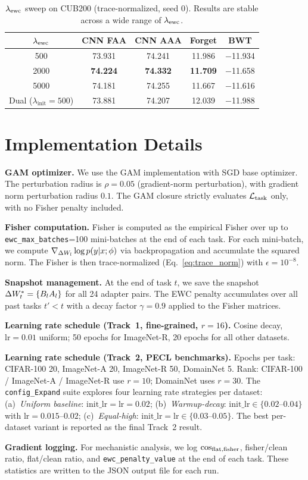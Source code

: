 \begin{table}[h]
\caption{$\lambda_{\mathrm{ewc}}$ sweep on CUB200 (trace-normalized, seed 0).
Results are stable across a wide range of $\lambda_{\mathrm{ewc}}$.}
\label{tab:lam_sweep}
\centering
\begin{tabular}{ccccc}
\toprule
$\lambda_{\mathrm{ewc}}$ & CNN FAA & CNN AAA & Forget & BWT \\
\midrule
500  & 73.931 & 74.241 & 11.986 & $-$11.934 \\
2000 & \textbf{74.224} & \textbf{74.332} & \textbf{11.709} & $-$11.658 \\
5000 & 74.181 & 74.255 & 11.667 & $-$11.616 \\
Dual ($\lambda_{\mathrm{init}}=500$) & 73.881 & 74.207 & 12.039 & $-$11.988 \\
\bottomrule
\end{tabular}
\end{table}

\section{Implementation Details}
\label{sec:impl}

\textbf{GAM optimizer.}
We use the GAM implementation with SGD base optimizer.
The perturbation radius is $\rho=0.05$ (gradient-norm perturbation),
with gradient norm perturbation radius $0.1$.
The GAM closure strictly evaluates $\mathcal{L}_{\mathrm{task}}$ only, with no Fisher penalty included.

\textbf{Fisher computation.}
Fisher is computed as the empirical Fisher over up to \texttt{ewc\_max\_batches}=100 mini-batches
at the end of each task.
For each mini-batch, we compute $\nabla_{\Delta W_l} \log p(y|x;\phi)$ via backpropagation
and accumulate the squared norm.
The Fisher is then trace-normalized (Eq.~\eqref{eq:trace_norm}) with $\epsilon=10^{-8}$.

\textbf{Snapshot management.}
At the end of task $t$, we save the snapshot $\Delta W^*_t = \{B_l A_l\}$ for all 24 adapter pairs.
The EWC penalty accumulates over all past tasks $t' < t$ with a decay factor $\gamma=0.9$
applied to the Fisher matrices.

\textbf{Learning rate schedule (Track~1, fine-grained, $r=16$).}
Cosine decay, $\mathrm{lr}=0.01$ uniform; 50 epochs for ImageNet-R, 20 epochs for all other datasets.

\textbf{Learning rate schedule (Track~2, PECL benchmarks).}
Epochs per task: CIFAR-100 20, ImageNet-A 20, ImageNet-R 50, DomainNet 5.
Rank: CIFAR-100 / ImageNet-A / ImageNet-R use $r=10$; DomainNet uses $r=30$.
The \texttt{config\_Expand} suite explores four learning rate strategies per dataset:
(a)~\emph{Uniform baseline}: $\mathrm{init\_lr}=\mathrm{lr}=0.02$;
(b)~\emph{Warmup-decay}: $\mathrm{init\_lr}\in\{0.02$--$0.04\}$ with $\mathrm{lr}=0.015$--$0.02$;
(c)~\emph{Equal-high}: $\mathrm{init\_lr}=\mathrm{lr}\in\{0.03$--$0.05\}$.
The best per-dataset variant is reported as the final Track~2 result.

\textbf{Gradient logging.}
For mechanistic analysis, we log $\cos_{\mathrm{flat,fisher}}$, fisher/clean ratio, flat/clean ratio,
and \texttt{ewc\_penalty\_value} at the end of each task.
These statistics are written to the JSON output file for each run.
